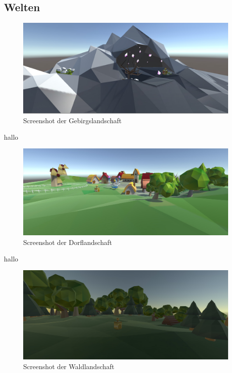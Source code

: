 \subsection{Welten}

\begin{figure}[!htbp]%
	\centering
		\includegraphics[width=1.0\textwidth]{images/Gebirge}
	\caption{Screenshot der Gebirgslandschaft}
	\label{fig:Gebirge}
\end{figure}

hallo


\begin{figure}[!htbp]%
	\centering
		\includegraphics[width=1.0\textwidth]{images/Dorf}
	\caption{Screenshot der Dorflandschaft}
	\label{fig:Dorf}
\end{figure}

hallo


\begin{figure}[!htbp]%
	\centering
		\includegraphics[width=1.0\textwidth]{images/Wald}
	\caption{Screenshot der Waldlandschaft}
	\label{fig:Wald}
\end{figure}

